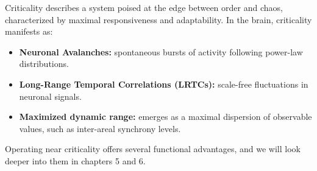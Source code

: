 Criticality describes a system poised at the edge between order and chaos, characterized by maximal responsiveness and adaptability. In the brain, criticality manifests as:
\begin{itemize}
\item \textbf{Neuronal Avalanches:} spontaneous bursts of activity following power-law distributions.
\item \textbf{Long-Range Temporal Correlations (LRTCs):} scale-free fluctuations in neuronal signals.
\item \textbf{Maximized dynamic range:} emerges as a maximal dispersion of observable values, such as inter-areal synchrony levels.
\end{itemize}

Operating near criticality offers several functional advantages, and we will look deeper into them in chapters 5 and 6. 

